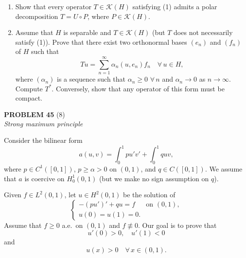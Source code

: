 \documentclass[12pt]{article}
\begin{document}
\begin{enumerate}
 
\item Show that every operator $T \in \mathcal{K}(H)$ satisfying (1) admits a polar decomposition
$T = U \circ P$, where $P \in \mathcal{K}(H)$.
 
\item Assume that $H$ is separable and $T \in \mathcal{K}(H)$ (but $T$ does not necessarily satisfy (1)).
Prove that there exist two orthonormal bases $(e_n)$ and $(f_n)$ of $H$ such that
\[
Tu = \sum_{n=1}^\infty \alpha_n (u, e_n) f_n \quad \forall\, u \in H,
\]
where $(\alpha_n)$ is a sequence such that $\alpha_n \ge 0$ $\forall\, n$ and $\alpha_n \to 0$ as $n \to \infty$.
Compute $T^*$. Conversely, show that any operator of this form must be compact.
\end{enumerate}
 
\bigskip
 
\noindent\textbf{PROBLEM 45} (8)\\[4pt]
\textit{Strong maximum principle}
 
\medskip
 
Consider the bilinear form
\[
a(u,v) = \int_0^1 p u' v' + \int_0^1 q u v,
\]
where $p \in C^1([0,1])$, $p \ge \alpha > 0$ on $(0,1)$, and $q \in C([0,1])$. We assume
that $a$ is coercive on $H^1_0(0,1)$ (but we make no sign assumption on $q$).
 
Given $f \in L^2(0,1)$, let $u \in H^2(0,1)$ be the solution of
\begin{equation}\tag{1}
\begin{cases}
-(pu')' + qu = f & \text{on } (0,1),\\
u(0) = u(1) = 0.
\end{cases}
\end{equation}
Assume that $f \ge 0$ a.e.\ on $(0,1)$ and $f \not\equiv 0$. Our goal is to prove that
\begin{equation}\tag{2}
u'(0) > 0,\quad u'(1) < 0
\end{equation}
and
\begin{equation}\tag{3}
u(x) > 0 \quad \forall\, x \in (0,1).
\end{equation}
 
\end{document}
